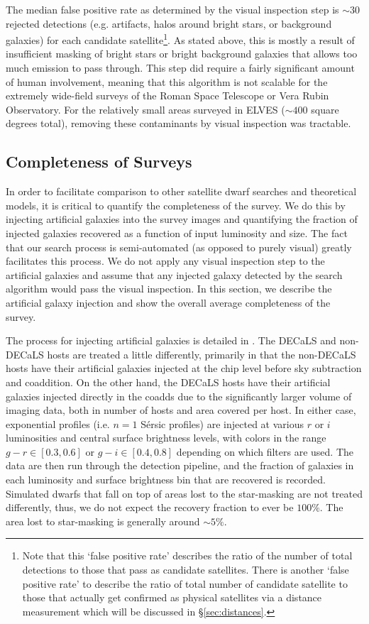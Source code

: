 \documentclass[twocolumn]{aastex62}
\begin{document}
The median false positive rate as determined by the visual inspection step is $\sim30$ rejected detections (e.g. artifacts, halos around bright stars, or background galaxies) for each candidate satellite\footnote{Note that this `false positive rate' describes the ratio of the number of total detections to those that pass as candidate satellites. There is another `false positive rate' to describe the ratio of total number of candidate satellite to those that actually get confirmed as physical satellites via a distance measurement which will be discussed in \S\ref{sec:distances}.}. As stated above, this is mostly a result of insufficient masking of bright stars or bright background galaxies that allows too much emission to pass through. This step did require a fairly significant amount of human involvement, meaning that this algorithm is not scalable for the extremely wide-field surveys of the Roman Space Telescope or Vera Rubin Observatory. For the relatively small areas surveyed in ELVES ($\sim400$ square degrees total), removing these contaminants by visual inspection was tractable. 






\subsection{Completeness of Surveys}
\label{sec:completeness}
In order to facilitate comparison to other satellite dwarf searches and theoretical models, it is critical to quantify the completeness of the survey. We do this by injecting artificial galaxies into the survey images and quantifying the fraction of injected galaxies recovered as a function of input luminosity and size. The fact that our search process is semi-automated (as opposed to purely visual) greatly facilitates this process. We do not apply any visual inspection step to the artificial galaxies and assume that any injected galaxy detected by the search algorithm would pass the visual inspection. In this section, we describe the artificial galaxy injection and show the overall average completeness of the survey. 


The process for injecting artificial galaxies is detailed in \citet{carlsten2020a}. The DECaLS and non-DECaLS hosts are treated a little differently, primarily in that the non-DECaLS hosts have their artificial galaxies injected at the chip level before sky subtraction and coaddition. On the other hand, the DECaLS hosts have their artificial galaxies injected directly in the coadds due to the significantly larger volume of imaging data, both in number of hosts and area covered per host.  In either case, exponential profiles (i.e. $n=1$ S\'{e}rsic profiles) are injected at various $r$ or $i$ luminosities and central surface brightness levels, with colors in the range $g-r\in[0.3,0.6]$ or $g-i\in[0.4,0.8]$ depending on which filters are used. The data are then run through the detection pipeline, and the fraction of galaxies in each luminosity and surface brightness bin that are recovered is recorded. Simulated dwarfs that fall on top of areas lost to the star-masking are not treated differently, thus, we do not expect the recovery fraction to ever be $100\%$. The area lost to star-masking is generally around $\sim5\%$.
\end{document}
